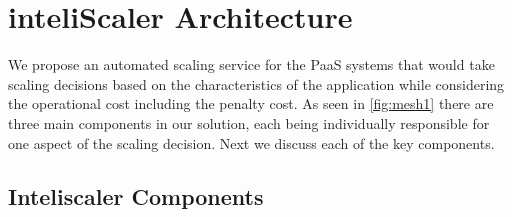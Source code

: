 \section{inteliScaler Architecture}
We propose an automated scaling service for the PaaS systems that would take scaling decisions based on the characteristics of the application while considering the operational cost including the penalty cost. As seen in  \ref{fig:mesh1} there are three main components in our solution, each being individually responsible for one aspect of the scaling decision. Next we discuss each of the key components.\\

\subsection{Inteliscaler Components}